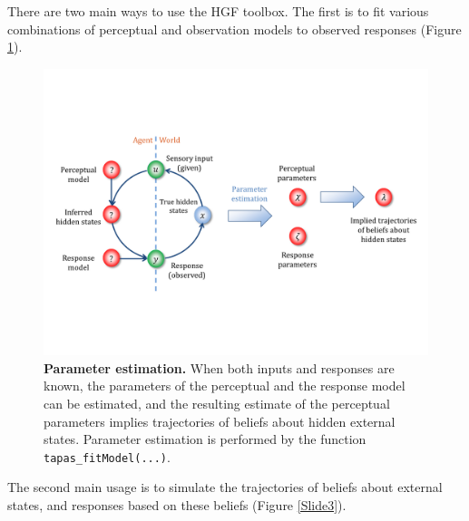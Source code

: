 \documentclass[11pt,a4paper]{article}
\numberwithin{equation}{section}
\begin{document}
There are two main ways to use the HGF toolbox. The first is to fit
various combinations of perceptual and observation models to observed
responses (Figure \ref{Slide2}).

\begin{figure}[h]
\renewcommand{\baselinestretch}{1}
\begin{center}
\includegraphics[width=14cm]{Graphics/Slide2}

\vspace{1ex}
\parbox{14cm}{\caption{\label{Slide2}
\textbf{\upshape Parameter estimation.}
When both inputs and responses are known, the parameters of the
perceptual and the response model can be estimated, and the resulting
estimate of the perceptual parameters implies trajectories of beliefs
about hidden external states. Parameter estimation is performed by the
function \texttt{\upshape tapas\_fitModel(...)}.}}
\end{center}
\end{figure}
 
The second main usage is to simulate the trajectories of beliefs about
external states, and responses based on these beliefs (Figure
\ref{Slide3}).
\end{document}
